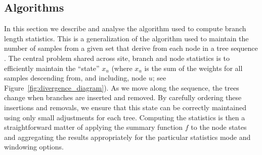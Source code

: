 \documentclass{article}
\begin{document}
\subsection*{Algorithms}
In this section we describe and analyse the algorithm used
to compute branch length statistics. This is a generalization
of the algorithm used to maintain the number of samples from a
given set that derive from each node in a tree
sequence \cite[Algorithm L]{kelleher2016efficient}. The central
problem shared across site, branch and node statistics
is to efficiently maintain the ``state'' $x_u$ (where $x_u$ is the
sum of the weights for all samples descending
from, and including, node $u$; see Figure~\ref{fig:divergence_diagram}).
As we move along the sequence, the trees change when branches are inserted and removed.
By carefully ordering these insertions and removals,
we ensure that this state can be correctly maintained
using only small adjustments for each tree.
Computing the statistics is then a straightforward matter of applying the summary function $f$
to the node states and aggregating the results appropriately for the
particular statistics mode and windowing options.
\end{document}
